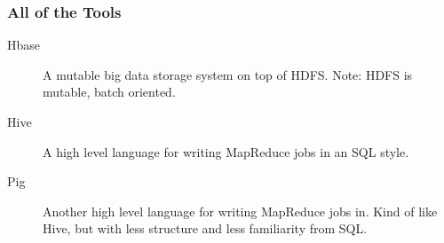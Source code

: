 \documentclass{beamer}
\begin{document}
\begin{frame}
  \frametitle{All of the Tools}
  \begin{description}
    \item[Hbase] A mutable big data storage system on top of HDFS. \alert{Note}: HDFS is mutable, batch oriented.
    \item[Hive] A high level language for writing MapReduce jobs in an SQL style.
    \item[Pig] Another high level language for writing MapReduce jobs in. Kind of like Hive, but with less structure and less familiarity from SQL.


  \end{description}
\end{frame}
\end{document}
